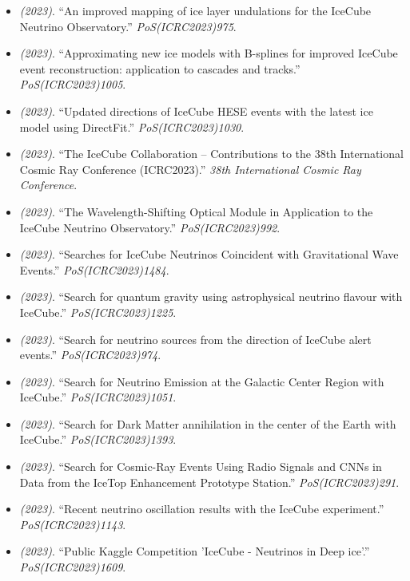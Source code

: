 \begin{itemize}
\item \textit{(2023)}. ``An improved mapping of ice layer undulations for the IceCube Neutrino Observatory.'' \textit{PoS(ICRC2023)975}.  
\item \textit{(2023)}. ``Approximating new ice models with B-splines for improved IceCube event reconstruction: application to cascades and tracks.'' \textit{PoS(ICRC2023)1005}.  
\item \textit{(2023)}. ``Updated directions of IceCube HESE events with the latest ice model using DirectFit.'' \textit{PoS(ICRC2023)1030}.  
\item \textit{(2023)}. ``The IceCube Collaboration -- Contributions to the 38th International Cosmic Ray Conference (ICRC2023).'' \textit{38th International Cosmic Ray Conference}. 
\item \textit{(2023)}. ``The Wavelength-Shifting Optical Module in Application to the IceCube Neutrino Observatory.'' \textit{PoS(ICRC2023)992}. 
\item \textit{(2023)}. ``Searches for IceCube Neutrinos Coincident with Gravitational Wave Events.'' \textit{PoS(ICRC2023)1484}. 
\item \textit{(2023)}. ``Search for quantum gravity using astrophysical neutrino flavour with IceCube.'' \textit{PoS(ICRC2023)1225}. 
\item \textit{(2023)}. ``Search for neutrino sources from the direction of IceCube alert events.'' \textit{PoS(ICRC2023)974}. 
\item \textit{(2023)}. ``Search for Neutrino Emission at the Galactic Center Region with IceCube.'' \textit{PoS(ICRC2023)1051}. 
\item \textit{(2023)}. ``Search for Dark Matter annihilation in the center of the Earth with IceCube.'' \textit{PoS(ICRC2023)1393}. 
\item \textit{(2023)}. ``Search for Cosmic-Ray Events Using Radio Signals and CNNs in Data from the IceTop Enhancement Prototype Station.'' \textit{PoS(ICRC2023)291}. 
\item \textit{(2023)}. ``Recent neutrino oscillation results with the IceCube experiment.'' \textit{PoS(ICRC2023)1143}. 
\item \textit{(2023)}. ``Public Kaggle Competition 'IceCube - Neutrinos in Deep ice'.'' \textit{PoS(ICRC2023)1609}. 

\end{itemize}
